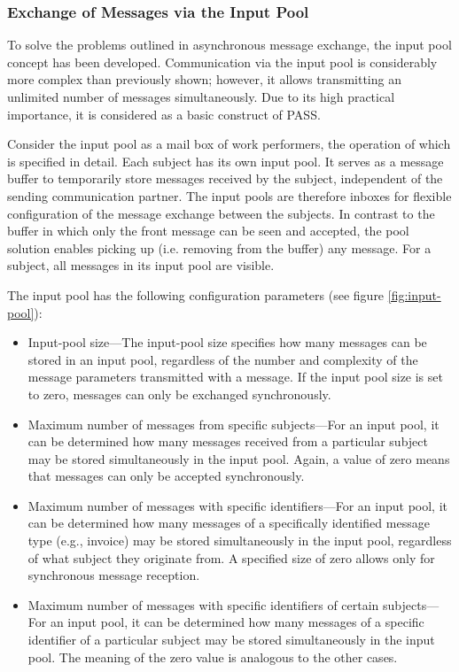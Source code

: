 \subsubsection{Exchange of Messages via the Input Pool}
\label{sec: inputpool}

To solve the problems outlined in asynchronous message exchange, the input pool concept has been developed. Communication via the input pool is considerably more complex than previously shown; however, it allows transmitting an unlimited number of messages simultaneously. Due to its high practical importance, it is considered as a basic construct of PASS.

Consider the input pool as a mail box of work performers, the operation of which is specified in detail. Each subject has its own input pool. It serves as a message buffer to temporarily store messages received by the subject, independent of the sending communication partner. The input pools are therefore inboxes for flexible configuration of the message exchange between the subjects. In contrast to the buffer in which only the front message can be seen and accepted, the pool solution enables picking up (i.e. removing from the buffer) any message. For a subject, all messages in its input pool are visible.

The input pool has the following configuration parameters (see figure \ref{fig:input-pool}):

\begin{itemize}
	\item Input-pool size---The input-pool size specifies how many messages can be stored in an input pool, regardless of the number and complexity of the message parameters transmitted with a message. If the input pool size is set to zero, messages can only be exchanged synchronously.
	\item Maximum number of messages from specific subjects---For an input pool, it can be determined how many messages received from a particular subject may be stored simultaneously in the input pool. Again, a value of zero means that messages can only be accepted synchronously.
	\item Maximum number of messages with specific identifiers---For an input pool, it can be determined how many messages of a specifically identified message type (e.g., invoice) may be stored simultaneously in the input pool, regardless of what subject they originate from. A specified size of zero allows only for synchronous message reception.
	\item Maximum number of messages with specific identifiers of certain subjects---For an input pool, it can be determined how many messages of a specific identifier of a particular subject may be stored simultaneously in the input pool. The meaning of the zero value is analogous to the other cases.
\end{itemize}


